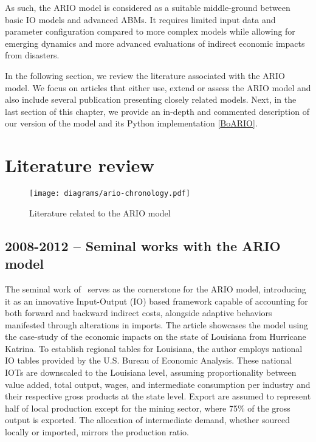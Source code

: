 As such, the ARIO model is considered as a suitable middle-ground between basic
IO models and advanced ABMs. It requires limited input data and parameter
configuration compared to more complex models while allowing for emerging
dynamics and more advanced evaluations of indirect economic impacts from disasters.

In the following section, we review the literature associated with the ARIO
model. We focus on articles that either use, extend or assess the ARIO model and also
include several publication presenting closely related models. Next, in the last section of
this chapter, we provide an in-depth and commented description of our version of
the model and its Python implementation
[\href{https://spjuhel.github.io/BoARIO/}{BoARIO}].

\section{Literature review}
\label{sec:ario-literature}

\begin{figure}[h!]
  \centering
  \texttt{[image: diagrams/ario-chronology.pdf]}
  \caption{Literature related to the ARIO model\label{fig:ario_chronology}}
\end{figure}

\subsection{2008-2012 -- Seminal works with the ARIO model}
The seminal work of~\textcite{hallegatte-2008-adapt-region}
serves as the cornerstone for the ARIO model, introducing it as an innovative
Input-Output (IO) based framework capable of accounting for both forward and
backward indirect costs, alongside adaptive behaviors manifested through
alterations in imports. The article showcases the model using the case-study of
the economic impacts on the state of Louisiana from Hurricane Katrina.
To establish regional tables for Louisiana,
the author employs national IO
tables provided by the U.S. Bureau of Economic Analysis. These national IOTs are
downscaled to the Louisiana level, assuming proportionality between value added,
total output, wages, and intermediate consumption per industry and their
respective gross products at the state level. Export are assumed to represent
half of local production except for the mining sector,
where 75\% of the gross output is exported. The allocation of intermediate
demand, whether sourced locally or imported, mirrors the production ratio.

